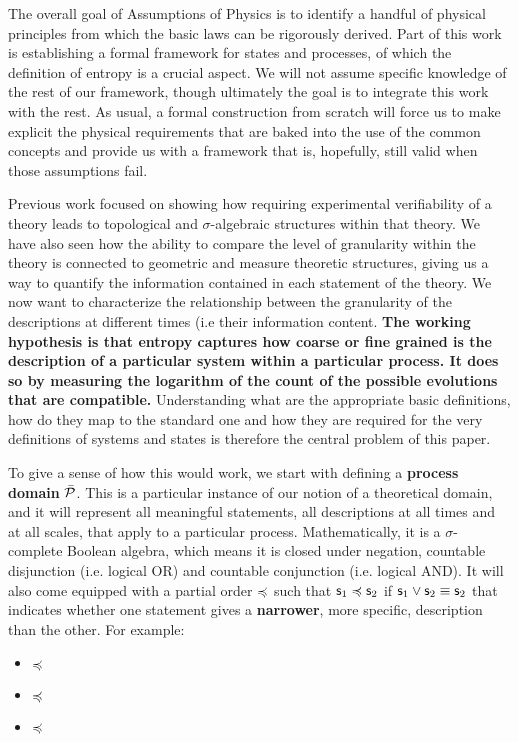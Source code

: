 \documentclass[10pt, onecolumn, longbibliography, nofootinbib]{revtex4-2}
\begin{document}
The overall goal of Assumptions of Physics is to identify a handful of physical principles from which the basic laws can be rigorously derived. Part of this work is establishing a formal framework for states and processes, of which the definition of entropy is a crucial aspect. We will not assume specific knowledge of the rest of our framework\cite{aop-book,aop-overview-verifiability}, though ultimately the goal is to integrate this work with the rest. As usual, a formal construction from scratch will force us to make explicit the physical requirements that are baked into the use of the common concepts and provide us with a framework that is, hopefully, still valid when those assumptions fail.

Previous work focused on showing how requiring experimental verifiability of a theory leads to topological and $\sigma$-algebraic structures within that theory. We have also seen how the ability to compare the level of granularity within the theory is connected to geometric and measure theoretic structures, giving us a way to quantify the information contained in each statement of the theory. We now want to characterize the relationship between the granularity of the descriptions at different times (i.e their information content. \textbf{The working hypothesis is that entropy captures how coarse or fine grained is the description of a particular system within a particular process. It does so by measuring the logarithm of the count of the possible evolutions that are compatible.} Understanding what are the appropriate basic definitions, how do they map to the standard one and how they are required for the very definitions of systems and states is therefore the central problem of this paper.

To give a sense of how this would work, we start with defining a \textbf{process domain} $\tdomain[P]$. This is a particular instance of our notion of a theoretical domain, and it will represent all meaningful statements, all descriptions at all times and at all scales, that apply to a particular process. Mathematically, it is a $\sigma$-complete Boolean algebra, which means it is closed under negation, countable disjunction (i.e. logical OR) and countable conjunction (i.e. logical AND). It will also come equipped with a partial order $\narrower$ such that $\stmt_1 \narrower \stmt_2$ if $\stmt_1 \OR \stmt_2 \equiv \stmt_2$ that indicates whether one statement gives a \textbf{narrower}, more specific, description than the other. For example:
\begin{itemize}
    \item {} $\narrower$ 
    \item {} $\narrower$ 
    \item {} $\narrower$ 
\end{itemize}
\end{document}

